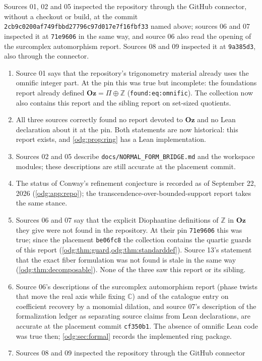 \documentclass[11pt,oneside]{article}
\numberwithin{equation}{section}
\theoremstyle{definition}
\theoremstyle{remark}
\newcommand{\Oz}{\mathbf{Oz}}
\newcommand{\Z}{\mathbb Z}
\newcommand{\C}{\mathbb C}
\newcommand{\pin}{\texttt{2cb9c0200af749fbbd27796c97d017e7f16fbf33}}
\newcommand{\replabel}[1]{\nolinkurl{#1}}
\newcommand{\fn}[1]{\nolinkurl{#1}}
\begin{document}
Sources 01, 02 and 05 inspected the repository through the GitHub connector,
without a checkout or build, at the commit \pin{} named above; sources 06 and
07 inspected it at
\texttt{71e9606} in the same way, and source 06 also read the opening of the
surcomplex automorphism report. Sources 08 and 09 inspected it at
\texttt{9a385d3}, also through the connector.
\begin{enumerate}[leftmargin=*]
\item Source 01 says that the repository's trigonometry material already uses
the omnific integer part. At the pin this was true but incomplete: the
foundations report already defined $\Oz=\Pi\oplus\Z$
(\replabel{found:eq:omnific}). The collection now also contains this report and
the sibling report on set-sized quotients.
\item All three sources correctly found no report devoted to $\Oz$ and no Lean
declaration about it at the pin. Both statements are now historical:
this report exists, and \cref{odg:prop:ring} has a Lean implementation.
\item Sources 02 and 05 describe \fn{docs/NORMAL_FORM_BRIDGE.md} and the
workspace modules; these descriptions are still accurate at the placement
commit.
\item The status of Conway's refinement conjecture is recorded as of
September 22, 2026 (\cref{odg:app:repo}); the transcendence-over-bounded-support
report takes the same stance.
\item Sources 06 and 07 say that the explicit Diophantine definitions of $\Z$
in $\Oz$ they give were not found in the repository. At their pin
\texttt{71e9606} this was true; since the placement \texttt{be06fc8} the
collection contains the quartic guards of this report
(\cref{odg:thm:guard,odg:thm:standarddef}). Source 13's statement that the
exact fiber formulation was not found is stale in the same way
(\cref{odg:thm:decomposable}). None of the three saw this report or its
sibling.
\item Source 06's descriptions of the surcomplex automorphism report (phase
twists that move the real axis while fixing $\C$) and of the catalogue entry
on coefficient recovery by a monomial dilation, and source 07's description of
the formalization ledger as separating source claims from Lean declarations,
are accurate at the placement commit \texttt{cf350b1}. The absence of omnific
Lean code was true then; \cref{odg:sec:formal} records the implemented ring package.
\item Sources 08 and 09 inspected the repository through the GitHub connector

\end{enumerate}
\end{document}
